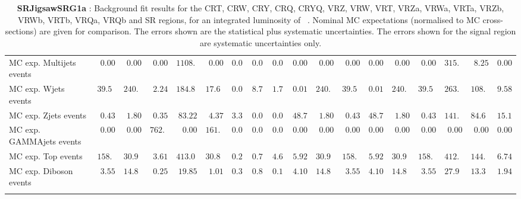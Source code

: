 \begin{table}
{\begin{tabular*}{\textwidth}{@{\extracolsep{\fill}}lrrrrrrrrrrrrrrrrr}
\noalign{\smallskip}\hline\noalign{\smallskip}
        MC exp. Multijets events         & $0.00$          & $0.00$          & $0.00$          & $1108.81$          & $0.00$          & $0.00$          & $0.00$          & $0.00$          & $0.00$          & $0.00$          & $0.00$          & $0.00$          & $0.00$          & $0.00$          & $315.73$          & $8.25$          & $0.00$              \\
        MC exp. Wjets events         & $39.55$          & $240.00$          & $2.24$          & $184.87$          & $17.61$          & $0.00$          & $8.73$          & $1.74$          & $0.01$          & $240.00$          & $39.55$          & $0.01$          & $240.00$          & $39.55$          & $263.75$          & $108.54$          & $9.58$              \\
        MC exp. Zjets events         & $0.43$          & $1.80$          & $0.35$          & $83.22$          & $4.37$          & $3.34$          & $0.06$          & $0.02$          & $48.79$          & $1.80$          & $0.43$          & $48.79$          & $1.80$          & $0.43$          & $141.71$          & $84.69$          & $15.10$              \\
        MC exp. GAMMAjets events         & $0.00$          & $0.00$          & $762.10$          & $0.00$          & $161.56$          & $0.00$          & $0.00$          & $0.00$          & $0.00$          & $0.00$          & $0.00$          & $0.00$          & $0.00$          & $0.00$          & $0.00$          & $0.00$          & $0.00$              \\
        MC exp. Top events         & $158.85$          & $30.96$          & $3.61$          & $413.01$          & $30.83$          & $0.28$          & $0.70$          & $4.61$          & $5.92$          & $30.96$          & $158.85$          & $5.92$          & $30.96$          & $158.85$          & $412.45$          & $144.05$          & $6.74$              \\
        MC exp. Diboson events         & $3.55$          & $14.86$          & $0.25$          & $19.85$          & $1.01$          & $0.36$          & $0.83$          & $0.18$          & $4.10$          & $14.86$          & $3.55$          & $4.10$          & $14.86$          & $3.55$          & $27.95$          & $13.30$          & $1.94$              \\
\noalign{\smallskip}\hline\noalign{\smallskip}
\end{tabular*}
}
\caption{{\bf SRJigsawSRG1a} : Background fit results for the CRT, CRW, CRY, CRQ, CRYQ, VRZ, VRW, VRT, VRZa, VRWa, VRTa, VRZb, VRWb, VRTb, VRQa, VRQb and SR regions, for an integrated luminosity of \ourintlumi~\ifb. Nominal MC expectations (normalised to MC cross-sections) are given for comparison. The errors shown are the statistical plus systematic uncertainties. The errors shown for the signal region are systematic uncertainties only.}
\label{table.results.systematics.in.logL.fit.CRT.CRW.CRY.CRQ.CRYQ.VRZ.VRW.VRT.VRZa.VRWa.VRTa.VRZb.VRWb.VRTb.VRQa.VRQb.SR.SRJigsawSRG1a}
\end{table}
%